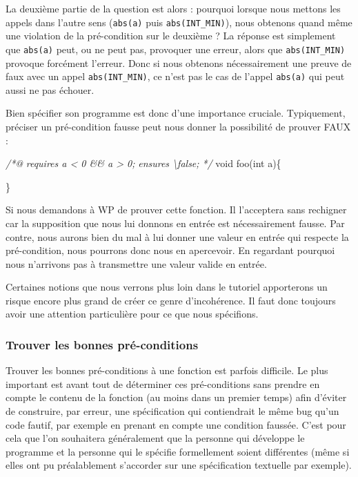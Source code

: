 \documentclass[12pt,francais,]{scrbook}
\newenvironment{Shaded}{}{}
\newcommand{\DataTypeTok}[1]{\textcolor[rgb]{0.56,0.13,0.00}{{#1}}}
\newcommand{\CommentTok}[1]{\textcolor[rgb]{0.38,0.63,0.69}{\textit{{#1}}}}
\newcommand{\NormalTok}[1]{{#1}}
\begin{document}
La deuxième partie de la question est alors : pourquoi lorsque nous
mettons les appels dans l'autre sens (\texttt{abs(a)} puis
\texttt{abs(INT\_MIN)}), nous obtenons quand même une violation de la
pré-condition sur le deuxième ? La réponse est simplement que
\texttt{abs(a)} peut, ou ne peut pas, provoquer une erreur, alors que
\texttt{abs(INT\_MIN)} provoque forcément l'erreur. Donc si nous
obtenons nécessairement une preuve de \og{}faux\fg{} avec un appel
\texttt{abs(INT\_MIN)}, ce n'est pas le cas de l'appel \texttt{abs(a)}
qui peut aussi ne pas échouer.

Bien spécifier son programme est donc d'une importance cruciale.
Typiquement, préciser un pré-condition fausse peut nous donner la
possibilité de prouver FAUX :

\begin{footnotesize}\begin{Shaded}
\begin{Highlighting}[]
\CommentTok{/*@}
\CommentTok{  requires a < 0 && a > 0;}
\CommentTok{  ensures  \textbackslash{}false;}
\CommentTok{*/}
\DataTypeTok{void} \NormalTok{foo(}\DataTypeTok{int} \NormalTok{a)\{}

\NormalTok{\}}
\end{Highlighting}
\end{Shaded}\end{footnotesize}

Si nous demandons à WP de prouver cette fonction. Il l'acceptera sans
rechigner car la supposition que nous lui donnons en entrée est
nécessairement fausse. Par contre, nous aurons bien du mal à lui donner
une valeur en entrée qui respecte la pré-condition, nous pourrons donc
nous en apercevoir. En regardant pourquoi nous n'arrivons pas à
transmettre une valeur valide en entrée.

Certaines notions que nous verrons plus loin dans le tutoriel
apporterons un risque encore plus grand de créer ce genre d'incohérence.
Il faut donc toujours avoir une attention particulière pour ce que nous
spécifions.

\subsubsection{Trouver les bonnes
pré-conditions}\label{trouver-les-bonnes-pruxe9-conditions}

Trouver les bonnes pré-conditions à une fonction est parfois difficile.
Le plus important est avant tout de déterminer ces pré-conditions sans
prendre en compte le contenu de la fonction (au moins dans un premier
temps) afin d'éviter de construire, par erreur, une spécification qui
contiendrait le même bug qu'un code fautif, par exemple en prenant en
compte une condition faussée. C'est pour cela que l'on souhaitera
généralement que la personne qui développe le programme et la personne
qui le spécifie formellement soient différentes (même si elles ont pu
préalablement s'accorder sur une spécification textuelle par exemple).
\end{document}
